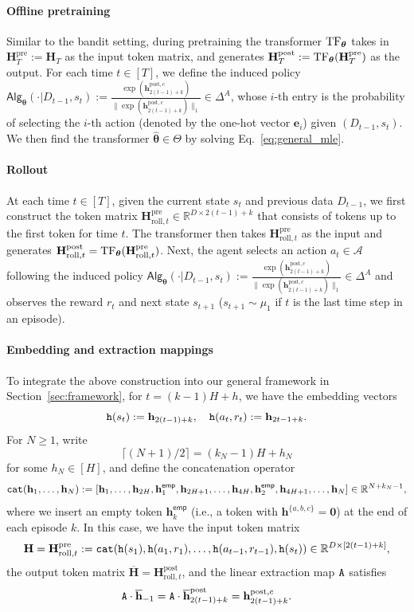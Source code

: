\documentclass[10pt]{article}
\renewcommand{\bar}{\overline}
\newcommand{\<}{\left\langle}
\renewcommand{\>}{\right\rangle}
\newcommand{\TF}{{\rm TF}}
\newcommand{\bzero}{{\mathbf 0}}
\newcommand{\R}{\mathbb{R}}
\newcommand{\pre}{{\mathrm{pre}}}
\newcommand{\post}{{\mathrm{post}}}
\newcommand{\parta}{{a}}
\newcommand{\partb}{{b}}
\newcommand{\partc}{{c}}
\newcommand{\state}{{s}}
\newcommand{\action}{{a}}
\newcommand{\reward}{{r}}
\newcommand{\totlen}{{T}}
\newcommand{\cat}{{\tt cat}}
\newcommand{\extractmap}{{\tt A}}
\newcommand{\embedmap}{{\tt h}}
\newcommand{\sAlg}{{\mathsf{Alg}}}
\newcommand{\dset}{{D}}
\newcommand{\esttfpar}{{\widehat{\btheta}}}
\newcommand{\horizon}{{H}}
\newcommand{\actionsp}{{\mathcal{A}}}
\renewcommand{\horizon}{{H}}
\newcommand{\init}{{\mu_1}}
\newcommand{\tfpar}{{\btheta}}
\newcommand{\tfparspace}{{\Theta}}
\newcommand{\roll}{{\mathrm{roll}}}
\newcommand{\Numact}{{A}}
\newcommand{\emp}{{\mathsf{emp}}}
\def\bH{{\mathbf H}}
\def\btheta{{\boldsymbol \theta}}
\def\be{{\mathbf e}}
\def\bh{{\mathbf h}}
\begin{document}
\paragraph{Offline pretraining}
Similar to the bandit setting, during
pretraining the transformer $\TF_\tfpar$ takes in   $\bH_\totlen^\pre:=\bH_\totlen$ as the input token matrix, and generates $\bH_\totlen^\post:=\TF_\tfpar(\bH_\totlen^\pre)$ as the output. For each time $t\in[\totlen]$, we define the  induced policy  $\sAlg_\tfpar(\cdot|\dset_{t-1},\state_t):=\frac{\exp(\bh^{\post,\partc}_{2(t-1)+k})}{\|\exp(\bh^{\post,\partc}_{2(t-1)+k})\|_1}\in\Delta^\Numact$, whose $i$-th entry is the probability of selecting the $i$-th action (denoted by the  one-hot vector $\be_i$) given $(\dset_{t-1},\state_t)$. We then find the transformer $\esttfpar\in\tfparspace$ by solving Eq.~\eqref{eq:general_mle}.
\paragraph{Rollout}
At each time $t\in[\totlen]$, given the  current state $\state_t$ and  previous data $\dset_{t-1}$, we first construct the token matrix $\bH^{\pre}_{\roll,t}\in\R^{D\times 2(t-1)+k}$ that consists of tokens up to the first token for time $t$.   The transformer then takes $\bH^{\pre}_{\roll,t}$ as the input  and generates $\bH^{\post}_{\roll,t}=\TF_\tfpar(\bH^{\pre}_{\roll,t})$. Next,  the agent selects an action $\action_t\in\actionsp$ following  the induced  policy $\sAlg_\tfpar(\cdot|\dset_{t-1},\state_t):=\frac{\exp(\bh^{\post,\partc}_{2(t-1)+k})}{\|\exp(\bh^{\post,\partc}_{2(t-1)+k})\|_1}\in\Delta^\Numact$ and observes the reward $\reward_t$ and next state $\state_{t+1}$ ($\state_{t+1}\sim\init$ if $t$ is the last time step in an episode).
\paragraph{Embedding and extraction mappings}
To integrate the above construction into our general framework in Section~\ref{sec:framework}, for $t=(k-1)\horizon+h$,  we have the embedding vectors $$\embedmap(\state_t):=\bh_{2(t-1)+k},~~~\embedmap(\action_t,\reward_t):=\bh_{2t-1+k}.$$  For $N\geq 1$, write $$\lceil(N+1)/2\rceil=(k_N-1)\horizon+h_N$$ for some $h_N\in[\horizon]$, and define the  concatenation operator
\begin{align*}
\cat(\bh_1, \ldots, \bh_N): = [\bh_1, \ldots,\bh_{2\horizon},\bh_{1}^{\emp}, \bh_{2\horizon+1},\ldots,\bh_{4\horizon},\bh_2^\emp,\bh_{4\horizon+1},\ldots, \bh_N]\in\R^{N+k_N-1},
\end{align*}
where we insert an empty token $\bh_k^\emp$ (i.e., a token with $\bh^{\{\parta,\partb,\partc\}}=\bzero$) at the end of  each episode $k$.
In this case, we have the input token matrix  $$\bH=\bH^\pre_{\roll,t}: = \cat(\embedmap(\state_1), \embedmap(\action_1, \reward_1), \ldots, \embedmap(\action_{t-1}, \reward_{t-1}), \embedmap(\state_t)) \in \R^{D \times [2(t-1)+k]},$$ the output token matrix $\bar{\bH}=\bH^\post_{\roll,t}$, and the linear extraction map $\extractmap$  satisfies $$\extractmap\cdot\bar{\bh}_{-1}=\extractmap\cdot\bar{\bh}^\post_{2(t-1)+k}=\bh^{\post,\partc}_{2(t-1)+k}.$$
\end{document}
